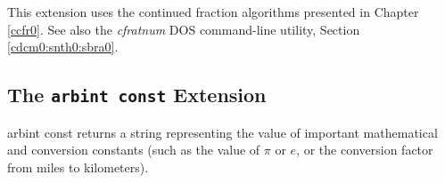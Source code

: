 \begin{tclcommandseealso}
This extension uses the continued fraction
algorithms presented in Chapter \ref{ccfr0}.
See also the \emph{cfratnum} DOS command-line utility, 
Section \ref{cdcm0:snth0:sbra0}.
\end{tclcommandseealso}


\subsection{The \texttt{arbint const} Extension}
\label{cxtn0:snth0:scex0}

\begin{tclcommandname}{arbint const}%
returns a string representing the value of important
mathematical and conversion constants (such as the value
of $\pi$ or $e$, or the conversion factor from miles to kilometers).
\end{tclcommandname}

\begin{tclcommandsynopsis}
\end{tclcommandsynopsis}

